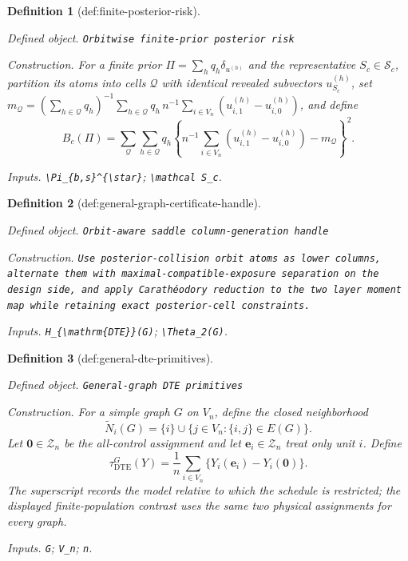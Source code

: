 \documentclass{article}
\newtheorem{definition}{Definition}
\begin{document}
\begin{definition}[def:finite-posterior-risk]\label{def:finite-posterior-risk}
\par\smallskip\noindent\emph{Defined object.} \texttt{Orbitwise finite-\allowbreak{}prior posterior risk}
\par\smallskip\noindent\emph{Construction.} For a finite prior \(\Pi=\sum_hq_h\delta_{u^{(h)}}\) and the representative \(S_c\in\mathcal S_c\), partition its atoms into cells \(\mathcal Q\) with identical revealed subvectors \(u^{(h)}_{S_c}\), set \(m_{\mathcal Q}=(\sum_{h\in\mathcal Q}q_h)^{-1}\sum_{h\in\mathcal Q}q_h\,n^{-1}\sum_{i\in V_n}(u^{(h)}_{i,1}-u^{(h)}_{i,0})\), and define \[B_c(\Pi)=\sum_{\mathcal Q}\sum_{h\in\mathcal Q}q_h\left\{n^{-1}\sum_{i\in V_n}(u^{(h)}_{i,1}-u^{(h)}_{i,0})-m_{\mathcal Q}\right\}^2.\]
\par\smallskip\noindent\emph{Inputs.} \texttt{\textbackslash{}\allowbreak{}Pi\_\allowbreak{}\{b,\allowbreak{}s\}\allowbreak{}\textasciicircum{}\{\textbackslash{}\allowbreak{}star\}\allowbreak{}}; \texttt{\textbackslash{}\allowbreak{}mathcal S\_\allowbreak{}c}.
\end{definition}

\begin{definition}[def:general-graph-certificate-handle]\label{def:general-graph-certificate-handle}
\par\smallskip\noindent\emph{Defined object.} \texttt{Orbit-\allowbreak{}aware saddle column-\allowbreak{}generation handle}
\par\smallskip\noindent\emph{Construction.} \texttt{Use posterior-\allowbreak{}collision orbit atoms as lower columns,\allowbreak{} alternate them with maximal-\allowbreak{}compatible-\allowbreak{}exposure separation on the design side,\allowbreak{} and apply Carathéodory reduction to the two layer moment map while retaining exact posterior-\allowbreak{}cell constraints.}
\par\smallskip\noindent\emph{Inputs.} \texttt{H\_\allowbreak{}\{\textbackslash{}\allowbreak{}mathrm\{DTE\}\allowbreak{}\}\allowbreak{}(G)}; \texttt{\textbackslash{}\allowbreak{}Theta\_\allowbreak{}2(G)}.
\end{definition}

\begin{definition}[def:general-dte-primitives]\label{def:general-dte-primitives}
\par\smallskip\noindent\emph{Defined object.} \texttt{General-\allowbreak{}graph DTE primitives}
\par\smallskip\noindent\emph{Construction.} For a simple graph \(G\) on \(V_n\), define the closed neighborhood
\[
\widetilde N_i(G)=\{i\}\cup\{j\in V_n:\{i,j\}\in E(G)\}.
\]
Let \(\mathbf 0\in\mathcal Z_n\) be the all-control assignment and let \(\mathbf e_i\in\mathcal Z_n\) treat only unit \(i\). Define
\[
\tau_{\mathrm{DTE}}^G(Y)
=\frac1n\sum_{i\in V_n}\{Y_i(\mathbf e_i)-Y_i(\mathbf 0)\}.
\]
The superscript records the model relative to which the schedule is restricted; the displayed finite-population contrast uses the same two physical assignments for every graph.
\par\smallskip\noindent\emph{Inputs.} \texttt{G}; \texttt{V\_\allowbreak{}n}; \texttt{n}.
\end{definition}
\end{document}
